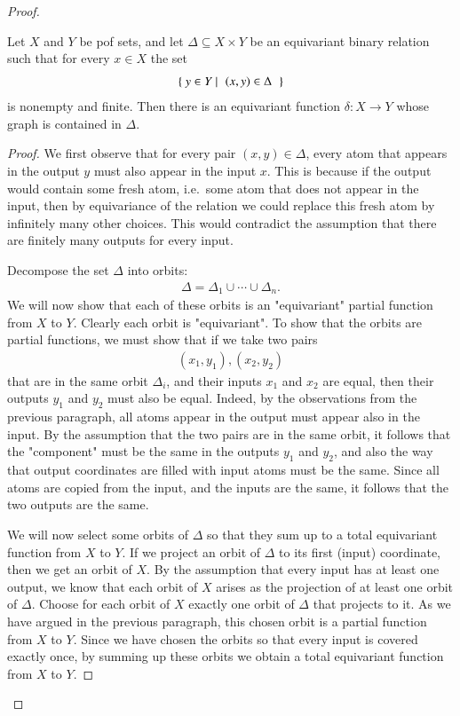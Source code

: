 \begin{proof}
    \begin{lemma}\label{lem:uniformization-pof}
        Let $X$ and $Y$ be pof sets, and let  $\Delta \subseteq X \times Y$ be an equivariant binary relation such that for every $x \in X$ the set 
        \begin{align*}
        \setbuild{ y \in Y}{$(x,y) \in \Delta$}
        \end{align*}
        is nonempty and finite. Then there is an equivariant function $\delta : X \to Y$ whose graph is contained in $\Delta$.
    \end{lemma}
    \begin{proof}
        We first observe that for every pair $(x,y) \in \Delta$, every atom that appears in the output $y$ must also appear in the input $x$. This is because if the output would contain some fresh atom, i.e.~some atom that does not appear in the input, then by equivariance of the relation we could replace this fresh atom by infinitely many other choices. This would  contradict the assumption that there are finitely many outputs for every input. 

        Decompose the set $\Delta$ into orbits: 
        \begin{align*}
        \Delta = \Delta_1 \cup \cdots \cup \Delta_n.
        \end{align*}
        We will now show that each of these orbits  is an "equivariant" partial function from $X$ to $Y$. Clearly each orbit is "equivariant". To show that the orbits are partial functions, we must show that if we take two pairs 
        \begin{align*}
        (x_1,y_1), (x_2,y_2)
        \end{align*}
        that are in the same orbit $\Delta_i$, and their inputs $x_1$ and $x_2$ are equal, then their outputs $y_1$ and $y_2$ must also be equal. Indeed, by the observations from the previous paragraph, all atoms appear in the output must appear also in the input. By the assumption that the two pairs are in the same orbit, it follows that the "component" must be the same in the outputs $y_1$ and $y_2$, and also the way that output coordinates are filled with input  atoms  must be the same. Since all atoms are copied from the input, and the inputs are the same, it follows that the two outputs are the same. 

        We will now select some orbits of $\Delta$ so that they sum up to a total equivariant function from $X$ to $Y$.
        If we project an orbit of $\Delta$ to its first (input) coordinate, then we get an orbit of $X$. By the assumption that every input has at least one output, we know that each orbit of $X$ arises as  the projection of at least one orbit of $\Delta$. Choose for each orbit of $X$ exactly one orbit of $\Delta$ that projects to it. As we have argued in the previous paragraph, this chosen orbit is a partial function from $X$ to $Y$. Since we have chosen the orbits so that every input is covered exactly once, by summing up these orbits we obtain a total equivariant function from $X$ to $Y$.
    \end{proof}
\end{proof}








